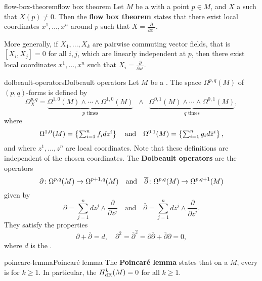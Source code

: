 \begin{topic}{flow-box-theorem}{flow box theorem}
    Let $M$ be a  with a point $p \in M$, and $X$ a  such that $X(p) \ne 0$. Then the \textbf{flow box theorem} states that there exist local coordinates $x^1, \ldots, x^n$ around $p$ such that $X = \frac{\partial}{\partial x^1}$.
    
    More generally, if $X_1, \ldots, X_k$ are pairwise commuting vector fields, that is $[X_i, X_j] = 0$ for all $i, j$, which are linearly independent at $p$, then there exist local coordinates $x^1, \ldots, x^n$ such that $X_i = \frac{\partial}{\partial x^i}$.
\end{topic}

\begin{topic}{dolbeault-operators}{Dolbeault operators}
    Let $M$ be a . The space $\Omega^{p, q}(M)$ of $(p, q)$-forms is defined by
    \[ \Omega_X^{p, q} = \underbrace{\Omega^{1,0}(M) \wedge \cdots \wedge \Omega^{1,0}(M)}_{\text{$p$ times}} \;\; \wedge \;\; \underbrace{\Omega^{0,1}(M) \wedge \cdots \wedge \Omega^{0,1}(M)}_{\text{$q$ times}} , \]
    where
    \[ \Omega^{1,0}(M) = \left\{ \textstyle\sum_{i = 1}^{n} f_i dz^i \right\} \quad \textup{and} \quad \Omega^{0,1}(M) = \left\{ \textstyle\sum_{i = 1}^{n} g_i d \overline{z}^i \right\} , \]
    and where $z^1, \ldots, z^n$ are local coordinates. Note that these definitions are independent of the chosen coordinates. The \textbf{Dolbeault operators} are the operators
    \[ \partial \colon \Omega^{p, q}(M) \to \Omega^{p + 1, q}(M) \quad \textup{and} \quad \overline{\partial} \colon \Omega^{p, q}(M) \to \Omega^{p, q + 1}(M) \]
    given by
    \[ \partial = \sum_{j = 1}^{n} dz^j \wedge \frac{\partial}{\partial z^j} \quad \text{and} \quad \bar{\partial} = \sum_{j = 1}^{n} d\bar{z}^j \wedge \frac{\partial}{\partial \bar{z}^j} . \]
    They satisfy the properties
    \[ \partial + \bar{\partial} = d, \quad \partial^2 = \bar{\partial}^2 = \partial \bar{\partial} + \bar{\partial} \partial = 0 , \]
    where $d$ is the .
\end{topic}

\begin{topic}{poincare-lemma}{Poincaré lemma}
    The \textbf{Poincaré lemma} states that on a   $M$, every  is  for $k \ge 1$. In particular, the  $H^k_\textup{dR}(M) = 0$ for all $k \ge 1$.
\end{topic}

